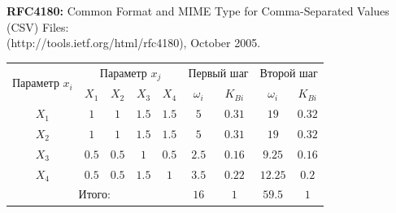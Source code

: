 \documentclass[11pt,oneside]{article}
\begin{document}
\begin{thebibliography}{X}
		
		
		 {\bf RFC4180:} {\sf Common Format and MIME Type for Comma-Separated Values (CSV) Files:}\\ (http://tools.ietf.org/html/rfc4180), October 2005. \vspace{-2mm}
		
	\end{thebibliography}
	
	\newpage
	\begin{table}[h!]
		\begin{tabular}{|*{9}{c@{$\;$}|}}
			\hline
			\multirow{2}{*}{Параметр $x_i$} & \multicolumn{4}{|c|}{Параметр $x_j$} & \multicolumn{2}{|c|}{Первый шаг} & \multicolumn{2}{|c|}{Второй шаг} \\
			\cline{2-9}
			& $X_1$ & $X_2$ & $X_3$ & $X_4$ & $\omega_i$ & $K_{Bi}$ & $\omega_i$ & $K_{Bi}$ \\
			\hline
			$X_1$ & $1$ & $1$ & $1.5$ & $1.5$ & $5$ & $0.31$ & $19$ & $0.32$ \\
			\hline
			$X_2$ & $1$ & $1$ & $1.5$ & $1.5$ & $5$ & $0.31$ & $19$ & $0.32$ \\
			\hline
			$X_3$ & $0.5$ & $0.5$ & $1$ & $0.5$ & $2.5$ & $0.16$ & $9.25$ & $0.16$ \\
			\hline
			$X_4$ & $0.5$ & $0.5$ & $1.5$ & $1$ & $3.5$ & $0.22$ & $12.25$ & $0.2$ \\
			\hline
			\multicolumn{5}{|c|}{Итого:} & $16$ & $1$ & $59.5$ & $1$ \\
			\hline
		\end{tabular}
		\label{Tab:t}
	\end{table}
	
	
\end{document}
